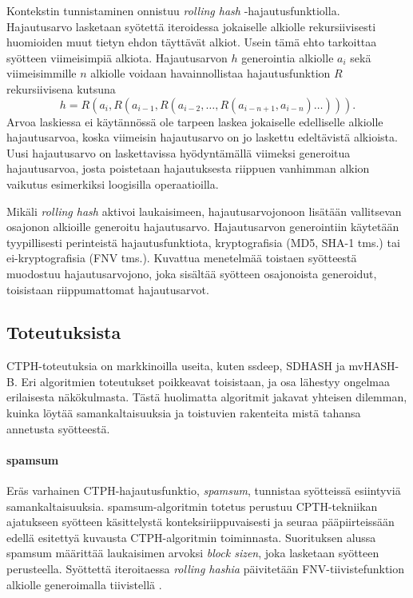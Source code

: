 \documentclass[12pt, a4paper]{article}
\begin{document}
	Kontekstin tunnistaminen onnistuu \textit{rolling hash} -hajautusfunktiolla. Hajautusarvo
	lasketaan syötettä iteroidessa jokaiselle alkiolle rekursiivisesti huomioiden muut tietyn
	ehdon täyttävät alkiot. Usein tämä ehto tarkoittaa syötteen viimeisimpiä alkiota.
	Hajautusarvon $h$ generointia alkiolle $a_i$ sekä viimeisimmille $n$ alkiolle voidaan
	havainnollistaa hajautusfunktion $R$ rekursiivisena kutsuna 
	\[h = R(a_i, R(a_{i-1}, R(a_{i-2}, \ldots, R(a_{i - n + 1}, a_{i - n}) \ldots ))).\]
	Arvoa laskiessa ei käytännössä ole tarpeen laskea jokaiselle edelliselle alkiolle
	hajautusarvoa, koska viimeisin hajautusarvo on
	jo laskettu edeltävistä alkioista. Uusi hajautusarvo on laskettavissa
	hyödyntämällä viimeksi generoitua hajautusarvoa, josta poistetaan
	hajautuksesta riippuen vanhimman alkion vaikutus esimerkiksi loogisilla operaatioilla.

	Mikäli \textit{rolling hash} aktivoi laukaisimeen,
	hajautusarvojonoon lisätään vallitsevan osajonon
	alkioille generoitu hajautusarvo.
	Hajautusarvon generointiin käytetään tyypillisesti perinteistä
	hajautusfunktiota, kryptografisia (MD5, SHA-1 tms.) tai ei-kryptografisia (FNV tms.).
	Kuvattua menetelmää toistaen syötteestä muodostuu hajautusarvojono,
		joka sisältää syötteen osajonoista generoidut, toisistaan
		riippumattomat hajautusarvot.

	\subsection*{Toteutuksista}

	CTPH-toteutuksia on markkinoilla useita, kuten ssdeep, SDHASH ja mvHASH-B.
	Eri algoritmien toteutukset poikkeavat toisistaan, ja osa lähestyy
	ongelmaa erilaisesta näkökulmasta. Tästä huolimatta algoritmit
	jakavat yhteisen dilemman, kuinka löytää samankaltaisuuksia ja
	toistuvien rakenteita mistä tahansa annetusta syötteestä.

	\paragraph{spamsum}
	Eräs varhainen CTPH-hajautusfunktio, \textit{spamsum}, tunnistaa
	syötteissä esiintyviä samankaltaisuuksia. spamsum-algoritmin
	totetus perustuu CPTH-tekniikan ajatukseen syötteen käsittelystä konteksiriippuvaisesti
	ja seuraa pääpiirteissään edellä esitettyä kuvausta CTPH-algoritmin toiminnasta.
	Suorituksen alussa spamsum määrittää laukaisimen arvoksi \textit{block sizen},
	joka lasketaan syötteen perusteella.
	Syöttettä iteroitaessa \textit{rolling hashia} päivitetään FNV-tiivistefunktion
	alkiolle generoimalla tiivistellä \parencite{IDENT}. 
\end{document}
